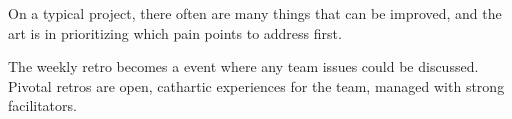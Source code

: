 On a typical project, there often are many things that can be improved, and the art is in prioritizing which pain points to address first.  


The weekly retro becomes a  event where any team issues could be discussed. Pivotal retros are open, cathartic experiences for the team, managed with strong facilitators. 


